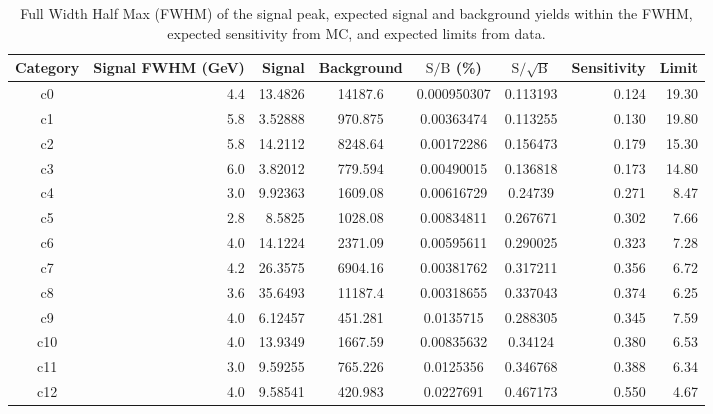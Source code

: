 \begin{table}[htb]
  \caption{Full Width Half Max (FWHM) of the signal peak, expected signal and background yields within the FWHM,
           expected sensitivity from MC, and expected limits from data.}
  \label{tab:cat_yields}
  \begin{center}
    \begin{tabular}{|c|r|r|c|c|c|r|r|}
      \hline\hline
      Category  & Signal FWHM (GeV) & Signal & Background & $\mathrm{S / B}$ (\%) & $\mathrm{S / \sqrt{B}}$ & Sensitivity & Limit \\  %
      \hline\hline
      c0          &        4.4           &      13.4826         &    14187.6        &     0.000950307    &     0.113193        & 0.124       & 19.30 \\
      c1          &        5.8           &      3.52888         &    970.875        &     0.00363474     &     0.113255        & 0.130       & 19.80 \\
      c2          &        5.8           &      14.2112         &    8248.64        &     0.00172286     &     0.156473        & 0.179       & 15.30 \\
      c3          &        6.0           &      3.82012         &    779.594        &     0.00490015     &     0.136818        & 0.173       & 14.80 \\
      c4          &        3.0           &      9.92363         &    1609.08        &     0.00616729     &     0.24739         & 0.271       &  8.47 \\
      c5          &        2.8           &      8.5825          &    1028.08        &     0.00834811     &     0.267671        & 0.302       &  7.66 \\
      c6          &        4.0           &      14.1224         &    2371.09        &     0.00595611     &     0.290025        & 0.323       &  7.28 \\
      c7          &        4.2           &      26.3575         &    6904.16        &     0.00381762     &     0.317211        & 0.356       &  6.72 \\
      c8          &        3.6           &      35.6493         &    11187.4        &     0.00318655     &     0.337043        & 0.374       &  6.25 \\
      c9          &        4.0           &      6.12457         &    451.281        &     0.0135715      &     0.288305        & 0.345       &  7.59 \\
      c10         &        4.0           &      13.9349         &    1667.59        &     0.00835632     &     0.34124         & 0.380       &  6.53 \\
      c11         &        3.0           &      9.59255         &    765.226        &     0.0125356      &     0.346768        & 0.388       &  6.34 \\
      c12         &        4.0           &      9.58541         &    420.983        &     0.0227691      &     0.467173        & 0.550       &  4.67 \\
      \hline\hline
    \end{tabular}
  \end{center}
\end{table}


